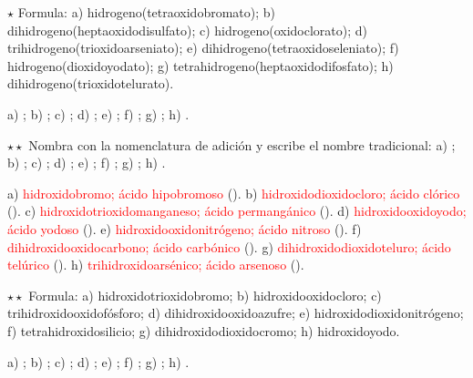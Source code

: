 \begin{exercise}
    \(\star\) Formula: a) hidrogeno(tetraoxidobromato); b) dihidrogeno(heptaoxidodisulfato); c) hidrogeno(oxidoclorato); d)
    trihidrogeno(trioxidoarseniato); e) dihidrogeno(tetraoxidoseleniato); f) hidrogeno(dioxidoyodato); g)
    tetrahidrogeno(heptaoxidodifosfato); h) dihidrogeno(trioxidotelurato).
    \begin{solu}
        a) \textcolor{red}{}; b) \textcolor{red}{}; c) \textcolor{red}{}; d)
        \textcolor{red}{}; e) \textcolor{red}{}; f) \textcolor{red}{}; g)
        \textcolor{red}{}; h) \textcolor{red}{}.
    \end{solu}
\end{exercise}

\begin{exercise}
    \(\star\star\) Nombra con la nomenclatura de adición y escribe el nombre tradicional: a) ; b) ;
    c) ; d) ; e) ; f) ; g) ; h) .
    \begin{solu}
        a) \textcolor{red}{hidroxidobromo; ácido hipobromoso} (). b) \textcolor{red}{hidroxidodioxidocloro; ácido
        clórico} (). c) \textcolor{red}{hidroxidotrioxidomanganeso; ácido permangánico} (). d)
        \textcolor{red}{hidroxidooxidoyodo; ácido yodoso} (). e) \textcolor{red}{hidroxidooxidonitrógeno; ácido nitroso}
        (). f) \textcolor{red}{dihidroxidooxidocarbono; ácido carbónico} (). g)
        \textcolor{red}{dihidroxidodioxidoteluro; ácido telúrico} (). h) \textcolor{red}{trihidroxidoarsénico; ácido
        arsenoso} ().
    \end{solu}
\end{exercise}

\begin{exercise}
    \(\star\star\) Formula: a) hidroxidotrioxidobromo; b) hidroxidooxidocloro; c) trihidroxidooxidofósforo; d)
    dihidroxidooxidoazufre; e) hidroxidodioxidonitrógeno; f) tetrahidroxidosilicio; g) dihidroxidodioxidocromo; h) hidroxidoyodo.
    \begin{solu}
        a) \textcolor{red}{}; b) \textcolor{red}{}; c) \textcolor{red}{}; d)
        \textcolor{red}{}; e) \textcolor{red}{}; f) \textcolor{red}{}; g)
        \textcolor{red}{}; h) \textcolor{red}{}.
    \end{solu}
\end{exercise}

